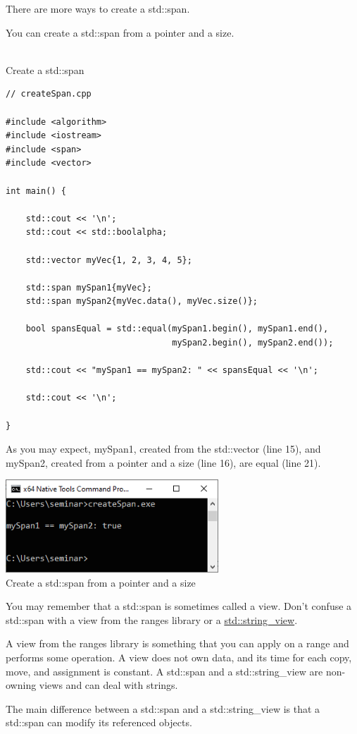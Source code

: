There are more ways to create a std::span.



You can create a std::span from a pointer and a size.

\hspace*{\fill} \\ %
\noindent
Create a std::span
\begin{lstlisting}[style=styleCXX]
// createSpan.cpp

#include <algorithm>
#include <iostream>
#include <span>
#include <vector>

int main() {
	
	std::cout << '\n';
	std::cout << std::boolalpha;
	
	std::vector myVec{1, 2, 3, 4, 5};
	
	std::span mySpan1{myVec};
	std::span mySpan2{myVec.data(), myVec.size()};
	
	bool spansEqual = std::equal(mySpan1.begin(), mySpan1.end(),
	                             mySpan2.begin(), mySpan2.end());
	
	std::cout << "mySpan1 == mySpan2: " << spansEqual << '\n';
	
	std::cout << '\n';

}
\end{lstlisting}

As you may expect, mySpan1, created from the std::vector (line 15), and mySpan2, created from a pointer and a size (line 16), are equal (line 21).

\begin{center}
\includegraphics[width=0.6\textwidth]{content/3/chapter5/images/6.png}\\
Create a std::span from a pointer and a size
\end{center}

\begin{tcolorbox}[breakable,enhanced jigsaw,colback=red!5!white,colframe=red!75!black,title={A std::span is neither a std::string\_view nor a view}]
You may remember that a std::span is sometimes called a view. Don’t confuse a std::span with a view from the ranges library or a \href{https://www.modernescpp.com/index.php/c-17-what-s-new-in-the-library}{std::string\_view}.

A view from the ranges library is something that you can apply on a range and performs some operation. A view does not own data, and its time for each copy, move, and assignment is constant. A std::span and a std::string\_view are non-owning views and can deal with strings.

The main difference between a std::span and a std::string\_view is that a std::span can modify its referenced objects.
\end{tcolorbox}
	
